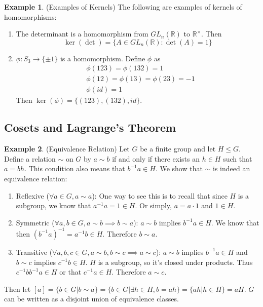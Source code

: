 \documentclass[12pt]{article}
\theoremstyle{definition}
\newcommand{\R}{\mathbb{R}}
\newtheorem{example}{\color{WildStrawberry}Example}
\theoremstyle{definition}
\begin{document}
\begin{example}(Examples of Kernels)
The following are examples of kernels of homomorphisms:
\begin{enumerate}
	\item The determinant is a homomorphism from $GL_n(\mathbb{R})$ to $\R^{\times}$. Then
	\begin{equation}
		\ker(\det) = \{ A \in GL_n(\R) : \det(A) = 1 \}
	\end{equation}
	\item $\phi : S_3 \to \{\pm 1\}$ is a homomorphism. Define $\phi$ as 
	\begin{align*}
		&\phi(1 2 3) = \phi(1 3 2) = 1\\
		&\phi(1 2) = \phi(1 3) = \phi(2 3) = -1 \\
		&\phi(id) = 1
	\end{align*}
	Then $\ker(\phi) = \{(1 2 3), (1 3 2), id \}$.
\end{enumerate}
\end{example}

\subsection{Cosets and Lagrange's Theorem}
\begin{example}(Equivalence Relation)
Let $G$ be a finite group and let $H \leq G$. Define a relation $\sim$ on $G$ by $a \sim b$ if and only if there exists an $h \in H$ such that $a = bh$. This condition also means that $b^{-1}a \in H$. We show that $\sim$ is indeed an equivalence relation:
\begin{enumerate}
	\item Reflexive ($\forall a \in G, a \sim a$): One way to see this is to recall that since $H$ is a subgroup, we know that $a^{-1}a = 1 \in H$. Or simply, $a = a \cdot 1$ and $1 \in H$. 
	\item Symmetric ($\forall a,b \in G, a \sim b \implies b \sim a$): $a \sim b$ implies $b^{-1}a \in H$. We know that then $(b^{-1}a)^{-1} = a^{-1}b \in H$. Therefore $b \sim a$. 
	\item Transitive ($\forall a,b,c \in G, a \sim b, b\sim c \implies a \sim c$): $a \sim b$ implies $b^{-1}a \in H$ and $b \sim c$ implies $c^{-1}b \in H$. $H$ is a subgroup, so it's closed under products. Thus $c^{-1}bb^{-1}a \in H$ or that $c^{-1}a \in H$. Therefore $a \sim c$.
\end{enumerate}
Then let $[a] = \{ b \in G | b \sim a \} = \{b \in G | \exists h \in H, b = ah \} = \{ah | h \in H \} = aH$. $G$ can be written as a disjoint union of equivalence classes. 
\end{example}
\end{document}
